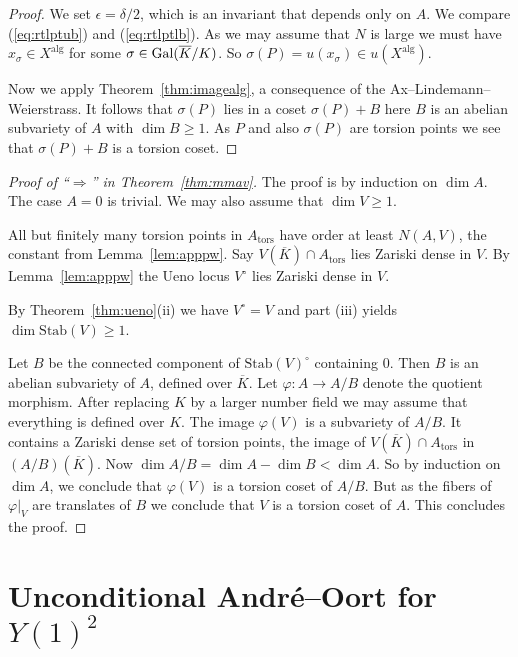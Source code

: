 \begin{proof}
  We set $\epsilon = \delta/2$, which is an invariant that depends only
  on $A$. We compare (\ref{eq:rtlptub}) and (\ref{eq:rtlptlb}). As we
  may assume that $N$ is large we must have $x_\sigma \in
  X^{\mathrm{alg}}$ for some $\sigma\in \mathrm{Gal}(\overline{K}/K)$. 
  So $\sigma(P) = u(x_\sigma)  \in u(X^{\mathrm{alg}})$.

  Now we apply Theorem~\ref{thm:imagealg}, a consequence of the
  Ax--Lindemann--Weierstrass. It follows that $\sigma(P)$ lies in a
  coset $\sigma(P)+B$ here $B$ is an abelian subvariety of $A$ with
  $\dim B\ge 1$. As $P$ and also $\sigma(P)$ are torsion points we see
  that $\sigma(P)+B$ is a torsion coset.
\end{proof}


\begin{proof}[Proof of ``$\Longrightarrow$'' in
  Theorem~\ref{thm:mmav}]
  The proof is by induction on $\dim A$. The case $A=0$ is trivial. 
  We may also assume that $\dim V\ge 1$.

  All but finitely many torsion
  points in $A_{\mathrm{tors}}$ have order at least $N(A,V)$, the
  constant from Lemma~\ref{lem:apppw}.
  Say $V(\overline K)\cap A_{\mathrm{tors}}$ lies Zariski dense in
  $V$. By Lemma~\ref{lem:apppw} 
  the Ueno locus $V^{\circ}$ lies Zariski dense in $V$.

  By Theorem~\ref{thm:ueno}(ii) we have $V^{\circ}=V$ and part (iii)
  yields $\dim \mathrm{Stab}(V) \ge 1$.

  Let $B$ be the connected component of $\mathrm{Stab}(V)^{\circ}$
  containing $0$. Then $B$ is an abelian subvariety of $A$, defined
  over $\overline K$. 
  Let $\varphi\colon A\rightarrow A/B$ denote the quotient morphism.
  After replacing $K$ by a larger number field we may assume that
  everything is defined over $K$.
  The image $\varphi(V)$ is a subvariety of $A/B$. It contains a
  Zariski dense set of torsion points, the image of $V(\overline
  K)\cap A_{\mathrm{tors}}$ in $(A/B)(\overline K)$.
  Now $\dim A/B = \dim A-\dim B<\dim A$. So by induction on $\dim A$,
  we conclude that $\varphi(V)$ is a torsion coset of $A/B$.
  But as the fibers of $\varphi|_V$ are translates of $B$ we conclude
  that $V$ is a torsion coset of $A$. This concludes the proof. 
\end{proof}

\section{Unconditional Andr\'e--Oort for $Y(1)^2$}

